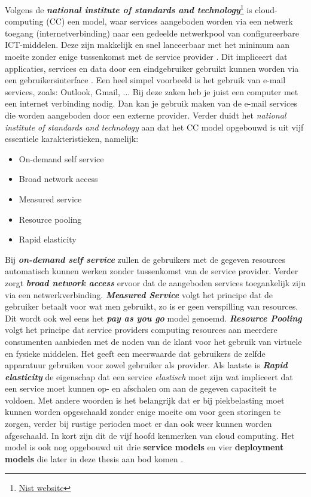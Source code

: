 Volgens de \textbf{\textit{national institute of standards and technology}}\footnote{\href{https://www.nist.gov/}{Nist website}} is cloud-computing (CC) een model, waar services aangeboden worden via een netwerk toegang (internetverbinding) naar een gedeelde netwerkpool van configureerbare ICT-middelen. Deze zijn makkelijk en snel lanceerbaar met het minimum aan moeite zonder enige tussenkomst met de service provider \autocite{mell2011nist}. Dit impliceert dat applicaties, services en data door een eindgebruiker gebruikt kunnen worden via een gebruikersinterface \autocite{malathi2011cloud}. Een heel simpel voorbeeld is het gebruik van e-mail services, zoals: Outlook, Gmail, ... Bij deze zaken heb je juist een computer met een internet verbinding nodig. Dan kan je gebruik maken van de e-mail services die worden aangeboden door een externe provider. Verder duidt het \textit{national institute of standards and technology} aan dat het CC model opgebouwd is uit vijf essentiele karakteristieken, namelijk:

\begin{itemize}
    \item On-demand self service
    \item Broad network access
    \item Measured service
    \item Resource pooling
    \item Rapid elasticity
\end{itemize}

Bij \textbf{\textit{on-demand self service}} zullen de gebruikers met de gegeven resources automatisch kunnen werken zonder tussenkomst van de service provider. Verder zorgt \textbf{\textit{broad network access}} ervoor dat de aangeboden services toegankelijk zijn via een netwerkverbinding. \textbf{\textit{Measured Service}} volgt het principe dat de gebruiker betaalt voor wat men gebruikt, zo is er geen verspilling van resources. Dit wordt ook wel eens het \textbf{\textit{pay as you go}} model genoemd. \textbf{\textit{Resource Pooling}} volgt het principe dat service providers computing resources aan meerdere consumenten aanbieden met de noden van de klant voor het gebruik van virtuele en fysieke middelen. Het geeft een meerwaarde dat gebruikers de zelfde apparatuur gebruiken voor zowel gebruiker als provider. Als laatste is \textbf{\textit{Rapid elasticity}} de eigenschap dat een service \textit{elastisch} moet zijn wat impliceert dat een service moet kunnen op- en afschalen om aan de gegeven capaciteit te voldoen. Met andere woorden is het belangrijk dat er bij piekbelasting moet kunnen worden opgeschaald zonder enige moeite om voor geen storingen te zorgen, verder bij rustige perioden moet er dan ook weer kunnen worden afgeschaald. In kort zijn dit de vijf hoofd kenmerken van cloud computing. Het model is ook nog opgebouwd uit drie \textbf{service models} en vier \textbf{deployment models} die later in deze thesis aan bod komen \autocite{mell2011nist}.
\newpage

